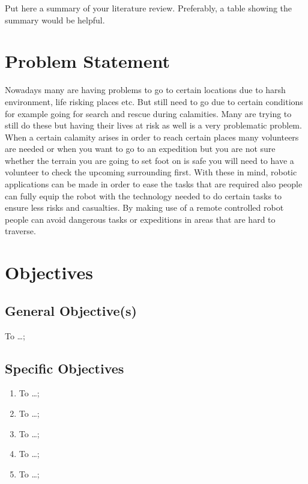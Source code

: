Put here a summary of your literature review.  Preferably, a table showing the summary would be helpful. 



\section{Problem Statement}
Nowadays many are having problems to go to certain locations due to harsh environment, life risking places etc. But still need to go due to certain conditions for example going for search and rescue during calamities. Many are trying to still do these but having their lives at risk as well is a very problematic problem. When a certain calamity arises in order to reach certain places many volunteers are needed or when you want to go to an expedition but you are not sure whether the terrain you are going to set foot on is safe you will need to have a volunteer to check the upcoming surrounding first. With these in mind, robotic applications can be made in order to ease the tasks that are required also people can fully equip the robot with the technology needed to do certain tasks to ensure less risks and casualties.
	By making use of a remote controlled robot people can avoid dangerous tasks or expeditions in areas that are hard to traverse.





\section{Objectives}
\subsection{General Objective(s)}
To \ldots;

\subsection{Specific Objectives}

\begin{enumerate}
	\item To  \ldots;
	
	\item To  \ldots;
	
	\item To  \ldots;
	
	\item To  \ldots;
	
	\item To  \ldots;
\end{enumerate}




